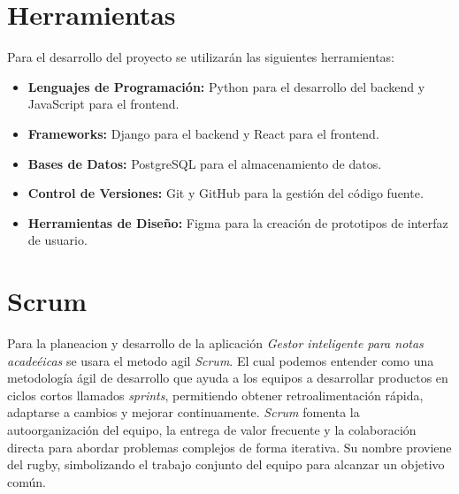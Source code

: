 \section{Herramientas}

Para el desarrollo del proyecto se utilizarán las siguientes herramientas:
\begin{itemize}
    \item \textbf{Lenguajes de Programación:} Python para el desarrollo del backend y JavaScript para el frontend.
    \item \textbf{Frameworks:} Django para el backend y React para el frontend.
    \item \textbf{Bases de Datos:} PostgreSQL para el almacenamiento de datos.
    \item \textbf{Control de Versiones:} Git y GitHub para la gestión del código fuente.
    \item \textbf{Herramientas de Diseño:} Figma para la creación de prototipos de interfaz de usuario.
\end{itemize}

\section{Scrum}
\noindent Para la planeacion y desarrollo de la aplicación \emph{Gestor inteligente para notas acadeéicas} se usara el metodo agil \textit{Scrum}. El cual podemos entender como una metodología ágil de desarrollo que ayuda a los equipos a desarrollar productos en ciclos cortos llamados \textit{sprints}, permitiendo obtener retroalimentación rápida, adaptarse a cambios y mejorar continuamente. \textit{Scrum} fomenta la autoorganización del equipo, la entrega de valor frecuente y la colaboración directa para abordar problemas complejos de forma iterativa. Su nombre proviene del rugby, simbolizando el trabajo conjunto del equipo para alcanzar un objetivo común\cite{Scrum}.
